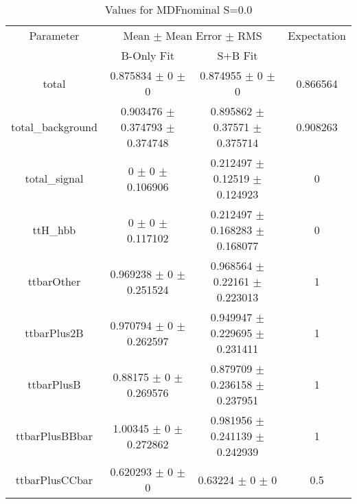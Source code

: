 \begin{table}
\centering
\caption{Values for MDFnominal S=0.0}
\begin{tabular}{cccc}
\toprule
Parameter & \multicolumn{2}{c}{Mean $\pm$ Mean Error $\pm$ RMS} & Expectation\\
 & B-Only Fit & S+B Fit & \\
\midrule
total & \num{0.875834} $\pm$ \num{0} $\pm$ \num{0} & \num{0.874955} $\pm$ \num{0} $\pm$ \num{0} & \num{0.866564}\\
total\_background & \num{0.903476} $\pm$ \num{0.374793} $\pm$ \num{0.374748} & \num{0.895862} $\pm$ \num{0.37571} $\pm$ \num{0.375714} & \num{0.908263}\\
total\_signal & \num{0} $\pm$ \num{0} $\pm$ \num{0.106906} & \num{0.212497} $\pm$ \num{0.12519} $\pm$ \num{0.124923} & \num{0}\\
ttH\_hbb & \num{0} $\pm$ \num{0} $\pm$ \num{0.117102} & \num{0.212497} $\pm$ \num{0.168283} $\pm$ \num{0.168077} & \num{0}\\
ttbarOther & \num{0.969238} $\pm$ \num{0} $\pm$ \num{0.251524} & \num{0.968564} $\pm$ \num{0.22161} $\pm$ \num{0.223013} & \num{1}\\
ttbarPlus2B & \num{0.970794} $\pm$ \num{0} $\pm$ \num{0.262597} & \num{0.949947} $\pm$ \num{0.229695} $\pm$ \num{0.231411} & \num{1}\\
ttbarPlusB & \num{0.88175} $\pm$ \num{0} $\pm$ \num{0.269576} & \num{0.879709} $\pm$ \num{0.236158} $\pm$ \num{0.237951} & \num{1}\\
ttbarPlusBBbar & \num{1.00345} $\pm$ \num{0} $\pm$ \num{0.272862} & \num{0.981956} $\pm$ \num{0.241139} $\pm$ \num{0.242939} & \num{1}\\
ttbarPlusCCbar & \num{0.620293} $\pm$ \num{0} $\pm$ \num{0} & \num{0.63224} $\pm$ \num{0} $\pm$ \num{0} & \num{0.5}\\
\bottomrule
\end{tabular}
\end{table}